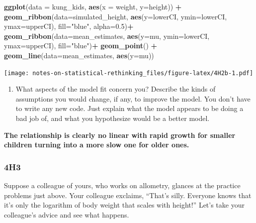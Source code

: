 \documentclass[
]{book}
\newenvironment{Shaded}{\begin{snugshade}}{\end{snugshade}}
\newcommand{\DataTypeTok}[1]{\textcolor[rgb]{0.13,0.29,0.53}{#1}}
\newcommand{\FloatTok}[1]{\textcolor[rgb]{0.00,0.00,0.81}{#1}}
\newcommand{\KeywordTok}[1]{\textcolor[rgb]{0.13,0.29,0.53}{\textbf{#1}}}
\newcommand{\NormalTok}[1]{#1}
\newcommand{\OperatorTok}[1]{\textcolor[rgb]{0.81,0.36,0.00}{\textbf{#1}}}
\newcommand{\StringTok}[1]{\textcolor[rgb]{0.31,0.60,0.02}{#1}}
\providecommand{\tightlist}{%
  \setlength{\itemsep}{0pt}\setlength{\parskip}{0pt}}
\begin{document}
\begin{Shaded}
\begin{Highlighting}[]
\KeywordTok{ggplot}\NormalTok{(}\DataTypeTok{data =}\NormalTok{ kung\_kids, }\KeywordTok{aes}\NormalTok{(}\DataTypeTok{x =}\NormalTok{ weight, }\DataTypeTok{y=}\NormalTok{height)) }\OperatorTok{+}\StringTok{ }
\StringTok{  }\KeywordTok{geom\_ribbon}\NormalTok{(}\DataTypeTok{data=}\NormalTok{simulated\_height, }\KeywordTok{aes}\NormalTok{(}\DataTypeTok{y=}\NormalTok{lowerCI, }\DataTypeTok{ymin=}\NormalTok{lowerCI, }\DataTypeTok{ymax=}\NormalTok{upperCI), }\DataTypeTok{fill=}\StringTok{"blue"}\NormalTok{, }\DataTypeTok{alpha=}\FloatTok{0.5}\NormalTok{)}\OperatorTok{+}
\StringTok{  }\KeywordTok{geom\_ribbon}\NormalTok{(}\DataTypeTok{data=}\NormalTok{mean\_estimates, }\KeywordTok{aes}\NormalTok{(}\DataTypeTok{y=}\NormalTok{mu, }\DataTypeTok{ymin=}\NormalTok{lowerCI, }\DataTypeTok{ymax=}\NormalTok{upperCI), }\DataTypeTok{fill=}\StringTok{"blue"}\NormalTok{)}\OperatorTok{+}
\StringTok{  }\KeywordTok{geom\_point}\NormalTok{() }\OperatorTok{+}\StringTok{ }
\StringTok{  }\KeywordTok{geom\_line}\NormalTok{(}\DataTypeTok{data=}\NormalTok{mean\_estimates, }\KeywordTok{aes}\NormalTok{(}\DataTypeTok{y=}\NormalTok{mu))}
\end{Highlighting}
\end{Shaded}

\texttt{[image: notes-on-statistical-rethinking\_files/figure-latex/4H2b-1.pdf]}

\begin{enumerate}
\def\labelenumi{\alph{enumi}.}
\setcounter{enumi}{2}
\tightlist
\item
  What aspects of the model fit concern you? Describe the kinds of assumptions you would
  change, if any, to improve the model. You don't have to write any new code. Just explain what the
  model appears to be doing a bad job of, and what you hypothesize would be a better model.
\end{enumerate}

\textbf{The relationship is clearly no linear with rapid growth for smaller children turning into a more slow one for older ones.}

\hypertarget{h3-2}{%
\subsubsection*{4H3}\label{h3-2}}

Suppose a colleague of yours, who works on allometry, glances at the practice problems just above. Your colleague exclaims, ``That's silly. Everyone knows that it's only the logarithm of body weight that scales with height!'' Let's take your colleague's advice and see what happens.
\end{document}
